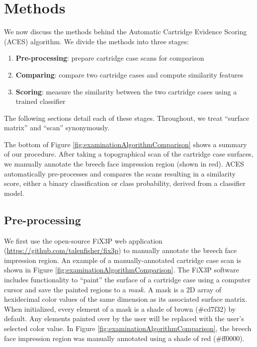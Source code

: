 \documentclass[11pt,]{isuthesis}
\begin{document}
\hypertarget{methods}{%
\section{Methods}\label{methods}}

We now discuss the methods behind the Automatic Cartridge Evidence Scoring (ACES) algorithm. We divide the methods into three stages:

\begin{enumerate}
\def\labelenumi{\arabic{enumi}.}
\item
  \textbf{Pre-processing}: prepare cartridge case scans for comparison
\item
  \textbf{Comparing}: compare two cartridge cases and compute similarity features
\item
  \textbf{Scoring}: measure the similarity between the two cartridge cases using a trained classifier
\end{enumerate}

The following sections detail each of these stages.
Throughout, we treat ``surface matrix'' and ``scan'' synonymously.

The bottom of Figure \ref{fig:examinationAlgorithmComparison} shows a summary of our procedure.
After taking a topographical scan of the cartridge case surfaces, we manually annotate the breech face impression region (shown in red).
ACES automatically pre-processes and compares the scans resulting in a similarity score, either a binary classification or class probability, derived from a classifier model.

\hypertarget{pre-processing}{%
\subsection{Pre-processing}\label{pre-processing}}

We first use the open-source FiX3P web application (\url{https://github.com/talenfisher/fix3p}) to manually annotate the breech face impression region.
An example of a manually-annotated cartridge case scan is shown in Figure \ref{fig:examinationAlgorithmComparison}.
The FiX3P software includes functionality to ``paint'' the surface of a cartridge case using a computer cursor and save the painted regions to a \emph{mask.} A mask is a 2D array of hexidecimal color values of the same dimension as its associated surface matrix.
When initialized, every element of a mask is a shade of brown (\#cd7f32) by default.
Any elements painted over by the user will be replaced with the user's selected color value.
In Figure \ref{fig:examinationAlgorithmComparison}, the breech face impression region was manually annotated using a shade of red (\#ff0000).
\end{document}
